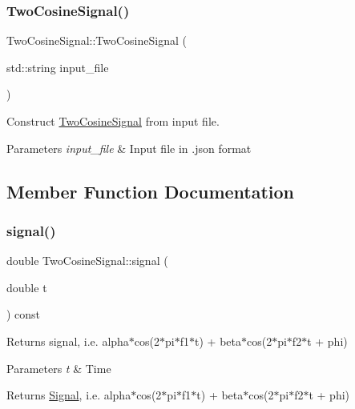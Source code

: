 \subsubsection{\texorpdfstring{Two\+Cosine\+Signal()}{TwoCosineSignal()}\hspace{0.1cm}{\footnotesize\ttfamily [2/2]}}
{\footnotesize\ttfamily Two\+Cosine\+Signal\+::\+Two\+Cosine\+Signal (\begin{DoxyParamCaption}\item[{std\+::string}]{input\+\_\+file }\end{DoxyParamCaption})}



Construct \hyperlink{classTwoCosineSignal}{Two\+Cosine\+Signal} from input file. 


\begin{DoxyParams}{Parameters}
{\em input\+\_\+file} & Input file in .json format \\
\hline
\end{DoxyParams}


\subsection{Member Function Documentation}
\mbox{\label{classTwoCosineSignal_a1129875198d637d80db6f083a207a3ba}} 
\subsubsection{\texorpdfstring{signal()}{signal()}}
{\footnotesize\ttfamily double Two\+Cosine\+Signal\+::signal (\begin{DoxyParamCaption}\item[{double}]{t }\end{DoxyParamCaption}) const\hspace{0.3cm}{\ttfamily [virtual]}}



Returns signal, i.\+e. alpha$\ast$cos(2$\ast$pi$\ast$f1$\ast$t) + beta$\ast$cos(2$\ast$pi$\ast$f2$\ast$t + phi) 


\begin{DoxyParams}{Parameters}
{\em t} & Time \\
\hline
\end{DoxyParams}
\begin{DoxyReturn}{Returns}
\hyperlink{classSignal}{Signal}, i.\+e. alpha$\ast$cos(2$\ast$pi$\ast$f1$\ast$t) + beta$\ast$cos(2$\ast$pi$\ast$f2$\ast$t + phi) 
\end{DoxyReturn}


